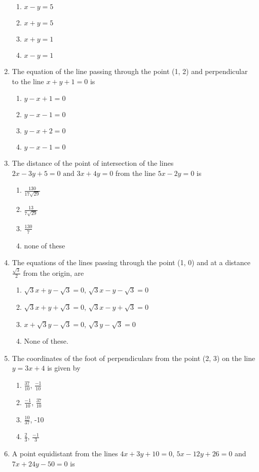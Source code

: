 \begin{enumerate}[label=\thesubsection.\arabic*, ref=\thesubsection.\theenumi]
\begin{enumerate}
\item $x-y=5$
\item $x+y=5$
\item $x+y=1$
\item $x-y=1$
\end{enumerate}
\item The equation of the line passing through the point (1, 2) and perpendicular to the line $x+y+1=0$ is
\begin {enumerate}
\item $y-x+1=0$
\item $y-x-1=0$
\item $y-x+2=0$
\item $y-x-1=0$
\end{enumerate}
\item The distance of the point of intersection of the lines $2x-3y+5=0 \text{ and }3x+4y=0$ from the line $5x-2y=0$ is
\begin{enumerate}
\item $\frac{130}{17\sqrt{29}}$
\item $\frac{13}{7\sqrt{29}}$
\item $\frac{130}{7}$
\item none of these
\end{enumerate}
\item The equations of the lines passing through the point (1, 0) and at a distance $\frac{\sqrt{3}}{2}$ from the origin,  are 
\begin{enumerate}
\item $\sqrt{3}x+y-\sqrt{3}=0$,  $\sqrt{3}x-y-\sqrt{3}=0$
\item $\sqrt{3}x+y+\sqrt{3}=0$,  $\sqrt{3}x-y+\sqrt{3}=0$
\item $x+\sqrt{3}y-\sqrt{3}=0$,  $\sqrt{3}y-\sqrt{3}=0$
\item None of these.
\end{enumerate}
\item The coordinates of the foot of perpendiculars from the point (2, 3) on the line $y=3x+4$ is given by 
\begin{enumerate} 
\item $\frac{37}{10}$,  $\frac{-1}{10}$
\item $\frac{-1}{10}$,  $\frac{37}{10}$
\item $\frac{10}{37}$,  -10
\item $\frac{2}{3}$,  $\frac{-1}{3}$
\end{enumerate}
\item A point equidistant from the lines $4x+3y+10=0$,  $5x-12y+26=0$ and $7x+24y-50=0$ is

\end{enumerate}
